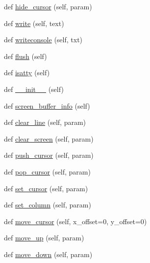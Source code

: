 \begin{DoxyCompactItemize}
def \hyperlink{classwaflib_1_1ansiterm_1_1_ansi_term_a2ca4bde33edd4afa92c8bda3f01d1dc9}{hide\+\_\+cursor} (self, param)
\item 
def \hyperlink{classwaflib_1_1ansiterm_1_1_ansi_term_a03ecdf1c9e54a69800aae320175c281b}{write} (self, text)
\item 
def \hyperlink{classwaflib_1_1ansiterm_1_1_ansi_term_a8296f875a3fd0a03fc109073f2a73a3e}{writeconsole} (self, txt)
\item 
def \hyperlink{classwaflib_1_1ansiterm_1_1_ansi_term_a08667242c11cdfd8b74d64f8191d4938}{flush} (self)
\item 
def \hyperlink{classwaflib_1_1ansiterm_1_1_ansi_term_a08e698612e76adc1aa3e26cdc5cb2009}{isatty} (self)
\item 
def \hyperlink{classwaflib_1_1ansiterm_1_1_ansi_term_ab397a7401f836bb9f96d9e54c6333821}{\+\_\+\+\_\+init\+\_\+\+\_\+} (self)
\item 
def \hyperlink{classwaflib_1_1ansiterm_1_1_ansi_term_afdb1bac8f2508bdf2279320b85286196}{screen\+\_\+buffer\+\_\+info} (self)
\item 
def \hyperlink{classwaflib_1_1ansiterm_1_1_ansi_term_ae9df276c42e0569ad63c20c19de62b93}{clear\+\_\+line} (self, param)
\item 
def \hyperlink{classwaflib_1_1ansiterm_1_1_ansi_term_aa94cc04f29c4c51e0013e5cb87c0fd07}{clear\+\_\+screen} (self, param)
\item 
def \hyperlink{classwaflib_1_1ansiterm_1_1_ansi_term_a9f489138508401c64c6927f215d8d6da}{push\+\_\+cursor} (self, param)
\item 
def \hyperlink{classwaflib_1_1ansiterm_1_1_ansi_term_a2093c2f7ded18188b0bf2989a0083a18}{pop\+\_\+cursor} (self, param)
\item 
def \hyperlink{classwaflib_1_1ansiterm_1_1_ansi_term_aba842837a7fe351aa8459aa375249c69}{set\+\_\+cursor} (self, param)
\item 
def \hyperlink{classwaflib_1_1ansiterm_1_1_ansi_term_acd65956a7d56681cc669acca5bdd43fb}{set\+\_\+column} (self, param)
\item 
def \hyperlink{classwaflib_1_1ansiterm_1_1_ansi_term_ade95c6eb1c7ed7928780aad4e6b4e268}{move\+\_\+cursor} (self, x\+\_\+offset=0, y\+\_\+offset=0)
\item 
def \hyperlink{classwaflib_1_1ansiterm_1_1_ansi_term_a7725bd9ed185458669ad7601fb7ff9d9}{move\+\_\+up} (self, param)
\item 
def \hyperlink{classwaflib_1_1ansiterm_1_1_ansi_term_a7b2ea0403457b7cd8d0ac4088064d812}{move\+\_\+down} (self, param)

\end{DoxyCompactItemize}

